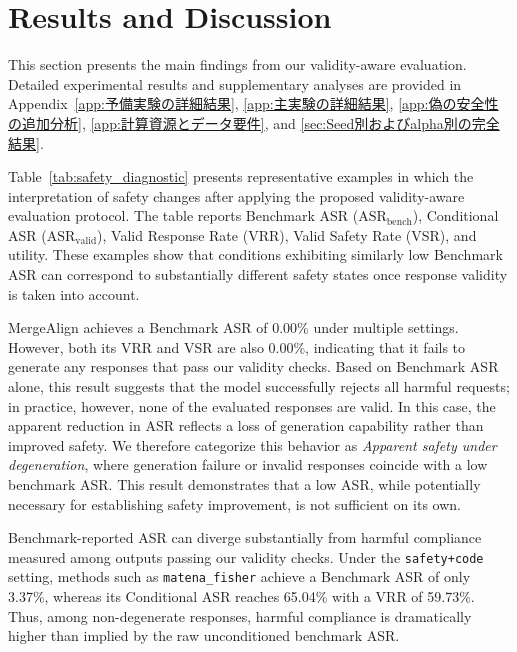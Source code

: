 \documentclass{article}
\begin{document}
\section{Results and Discussion}

This section presents the main findings from our validity-aware evaluation. Detailed experimental results and supplementary analyses are provided in Appendix~\ref{app:予備実験の詳細結果}, \ref{app:主実験の詳細結果}, \ref{app:偽の安全性の追加分析}, \ref{app:計算資源とデータ要件}, and \ref{sec:Seed別およびalpha別の完全結果}.

Table~\ref{tab:safety_diagnostic} presents representative examples in which the interpretation of safety changes after applying the proposed validity-aware evaluation protocol. The table reports Benchmark ASR ($\mathrm{ASR}_{\mathrm{bench}}$), Conditional ASR ($\mathrm{ASR}_{\mathrm{valid}}$), Valid Response Rate (VRR), Valid Safety Rate (VSR), and utility. These examples show that conditions exhibiting similarly low Benchmark ASR can correspond to substantially different safety states once response validity is taken into account.

MergeAlign achieves a Benchmark ASR of 0.00\% under multiple settings. However, both its VRR and VSR are also 0.00\%, indicating that it fails to generate any responses that pass our validity checks. Based on Benchmark ASR alone, this result suggests that the model successfully rejects all harmful requests; in practice, however, none of the evaluated responses are valid. In this case, the apparent reduction in ASR reflects a loss of generation capability rather than improved safety. We therefore categorize this behavior as \textit{Apparent safety under degeneration}, where generation failure or invalid responses coincide with a low benchmark ASR. This result demonstrates that a low ASR, while potentially necessary for establishing safety improvement, is not sufficient on its own.



Benchmark-reported ASR can diverge substantially from harmful compliance measured among outputs passing our validity checks.  Under the \texttt{safety+code} setting, methods such as \texttt{matena\_fisher} achieve a Benchmark ASR of only 3.37\%, whereas its Conditional ASR reaches 65.04\% with a VRR of 59.73\%. Thus, among non-degenerate responses, harmful compliance is dramatically higher than implied by the raw unconditioned benchmark ASR.
\end{document}
